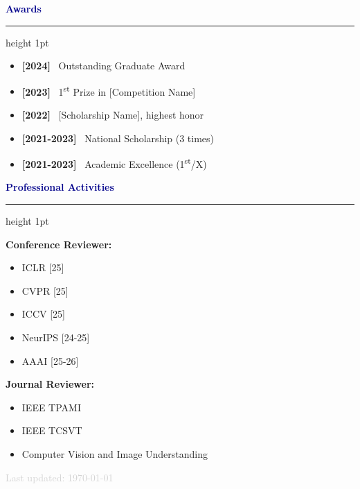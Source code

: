\documentclass[11pt, a4paper]{article}
\newcommand{\sectioncolor}[1]{\textcolor{darkblue}{#1}}
\newcommand{\secondarycolor}[1]{\textcolor{lightgray}{#1}}
\newcommand{\cvsection}[1]{
    \vspace{10pt}
    {\Large\bfseries\sectioncolor{#1}}
    \vspace{2pt}
    \hrule height 1pt
    \vspace{8pt}
}
\begin{document}
\hfill%
\begin{minipage}[t]{0.25\textwidth}

\vspace{-60pt} %
\begin{center}
    \fbox{\begin{minipage}{3cm}
        \centering
        \vspace{1.5cm}
        \textcolor{lightgray}{Photo}
        \vspace{1.5cm}
    \end{minipage}}
\end{center}

\vspace{20pt}

\cvsection{Awards}

\begin{itemize}[leftmargin=0pt, itemsep=4pt, label={}]
    \item \textbf{[2024]} \faGraduationCap\ Outstanding Graduate Award
    
    \item \textbf{[2023]} \faTrophy\ 1\textsuperscript{st} Prize in [Competition Name]
    
    \item \textbf{[2022]} \faStar\ [Scholarship Name], highest honor
    
    \item \textbf{[2021-2023]} \faStar\ National Scholarship (3 times)
    
    \item \textbf{[2021-2023]} \faStar\ Academic Excellence (1\textsuperscript{st}/X)
\end{itemize}

\vspace{15pt}

\cvsection{Professional Activities}

\textbf{Conference Reviewer:}
\begin{itemize}[leftmargin=10pt, itemsep=2pt, label={\tiny\faCircle}]
    \item ICLR [25]
    \item CVPR [25] 
    \item ICCV [25]
    \item NeurIPS [24-25]
    \item AAAI [25-26]
\end{itemize}

\vspace{8pt}

\textbf{Journal Reviewer:}
\begin{itemize}[leftmargin=10pt, itemsep=2pt, label={\tiny\faCircle}]
    \item IEEE TPAMI
    \item IEEE TCSVT
    \item Computer Vision and Image Understanding
\end{itemize}

\end{minipage}

\vspace{20pt}

\begin{center}
    \secondarycolor{\small Last updated: \today}
\end{center}
\end{document}
